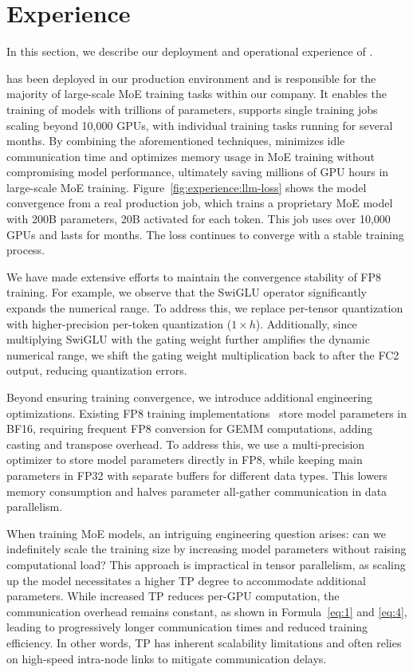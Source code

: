 \section{Experience}
\label{sec:experience}

In this section, we describe our deployment and operational experience of \sysname. 

 \sysname has been deployed in our production environment and is responsible for the majority of large-scale MoE training tasks within our company. It enables the training of models with trillions of parameters, supports single training jobs scaling beyond 10,000 GPUs, with individual training tasks running for several months. By combining the aforementioned techniques, \sysname minimizes idle communication time and optimizes memory usage in MoE training without compromising model performance, ultimately saving millions of GPU hours in large-scale MoE training. 
Figure~\ref{fig:experience:llm-loss} shows the model convergence from a real production job, which trains a proprietary MoE model with 200B parameters, 20B activated for each token. This job uses over 10,000 GPUs and lasts for months. The loss continues to converge with a stable training process.

 We have made extensive efforts to maintain the convergence stability of FP8 training. For example, we observe that the SwiGLU operator significantly expands the numerical range. To address this, we replace per-tensor quantization with higher-precision per-token quantization ($1 \times h$). Additionally, since multiplying SwiGLU with the gating weight further amplifies the dynamic numerical range, we shift the gating weight multiplication back to after the FC2 output, reducing quantization errors.

Beyond ensuring training convergence, we introduce additional engineering optimizations. Existing FP8 training implementations~\cite{transformer-engine, liang2024torchtitan} store model parameters in BF16, requiring frequent FP8 conversion for GEMM computations, adding casting and transpose overhead. To address this, we use a multi-precision optimizer to store model parameters directly in FP8, while keeping main parameters in FP32 with separate buffers for different data types. This lowers memory consumption and halves parameter all-gather communication in data parallelism.

 When training MoE models, an intriguing engineering question arises: can we indefinitely scale the training size by increasing model parameters without raising computational load? This approach is impractical in tensor parallelism, as scaling up the model necessitates a higher TP degree to accommodate additional parameters. While increased TP reduces per-GPU computation, the communication overhead remains constant, as shown in Formula~\ref{eq:1} and \ref{eq:4}, leading to progressively longer communication times and reduced training efficiency. In other words, TP has inherent scalability limitations and often relies on high-speed intra-node links to mitigate communication delays. 

